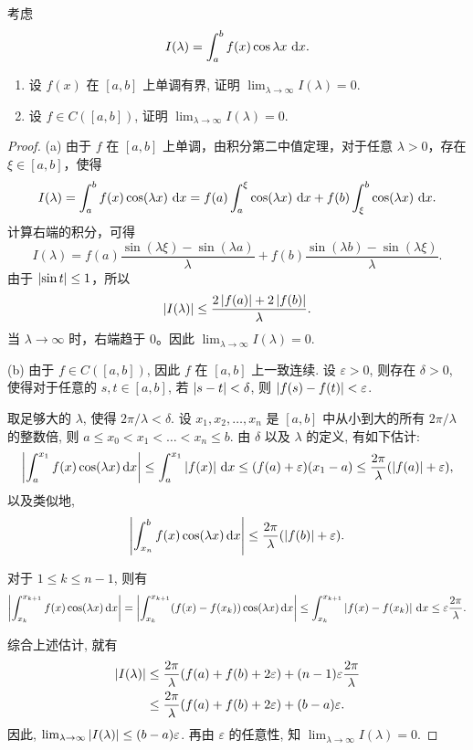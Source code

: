 \documentclass{article}
\begin{document}
\begin{problem}
考虑
\[
I(\lambda) = \int_a^b f(x)\cos \lambda x\,\,\mathrm{d} x.
\]
\begin{enumerate}[label=(\alph*)]
  \item 设 $f(x)$ 在 $[a,b]$ 上单调有界, 证明 $\lim_{\lambda \to \infty} I(\lambda) = 0$.
  \item 设 $f \in C([a,b])$, 证明 $\lim_{\lambda \to \infty} I(\lambda) = 0$.
\end{enumerate}
\end{problem}

\begin{proof}
  (a) 由于 \( f \) 在 \( [a,b] \) 上单调，由积分第二中值定理，对于任意 \( \lambda > 0 \)，存在 \( \xi \in [a,b] \)，使得
  \[ I(\lambda) = \int_a^b f(x)\cos (\lambda x)\,\,\mathrm{d} x = f(a) \int_a^\xi \cos (\lambda x)\,\,\mathrm{d} x + f(b) \int_\xi^b \cos (\lambda x)\,\,\mathrm{d} x. \]
  计算右端的积分，可得
  \[ I(\lambda) = f(a) \frac{\sin(\lambda \xi) - \sin(\lambda a)}{\lambda} + f(b) \frac{\sin(\lambda b) - \sin(\lambda \xi)}{\lambda}. \]
  由于 \( \left|\sin t\right| \le 1 \)，所以
  \[ \left|I(\lambda)\right| \le \frac{2\left|f(a)\right| + 2\left|f(b)\right|}{\lambda}. \]
  当 \( \lambda \to \infty \) 时，右端趋于 \( 0 \)。因此 \( \lim_{\lambda \to \infty} I(\lambda) = 0 \).

  (b) 由于 \( f\in C([a,b]) \), 因此 \( f \) 在 \( [a,b] \) 上一致连续. 设 \( \varepsilon>0 \), 则存在 \( \delta>0 \), 使得对于任意的 \( s,t\in[a,b] \), 若 \( \left|s-t\right|<\delta \), 则 \( \left|f(s)-f(t)\right|<\varepsilon \). 

  取足够大的 \( \lambda \), 使得 \( 2\pi/\lambda < \delta \). 设 \( x_1,x_2,\dots,x_n \) 是 \( [a,b] \) 中从小到大的所有 \( 2\pi/\lambda \) 的整数倍, 则 \( a\le x_0<x_1<\dots<x_n\le b \). 由 \( \delta \) 以及 \( \lambda \) 的定义, 有如下估计:
  \[ \left|\int_{a}^{x_1}f(x)\cos(\lambda x)\,\mathrm{d} x\right|
  \le \int_{a}^{x_1}\left|f(x)\right|\,\mathrm{d} x
  \le (f(a)+\varepsilon)(x_1-a)
  \le \frac{2\pi}{\lambda}(\left|f(a)\right|+\varepsilon), \]
  以及类似地,
  \[ \left|\int_{x_n}^{b}f(x)\cos(\lambda x)\,\mathrm{d} x\right|\le \frac{2\pi}{\lambda}(\left|f(b)\right|+\varepsilon). \]

  对于 \( 1\le k\le n-1 \), 则有
  \[ \left|\int_{x_k}^{x_{k+1}}f(x)\cos(\lambda x)\,\mathrm{d} x\right|
  =\left|\int_{x_k}^{x_{k+1}}(f(x)-f(x_k))\cos(\lambda x)\,\mathrm{d} x\right|
  \le \int_{x_k}^{x_{k+1}}\left|f(x)-f(x_k)\right|\,\mathrm{d} x
  \le \varepsilon \frac{2\pi}{\lambda} .\]

  综合上述估计, 就有
  \begin{align*}
    \left|I(\lambda)\right|
    &\le \frac{2\pi}{\lambda}(f(a)+f(b)+2\varepsilon) + (n-1)\varepsilon \frac{2\pi}{\lambda} \\
    &\le \frac{2\pi}{\lambda}(f(a)+f(b)+2\varepsilon)+(b-a)\varepsilon.
  \end{align*}
  因此, \( \lim_{\lambda\to\infty}\left|I(\lambda)\right| \le (b-a)\varepsilon \). 再由 \( \varepsilon \) 的任意性, 知 \( \lim_{\lambda\to\infty}I(\lambda)=0 \).
\end{proof}
\end{document}
